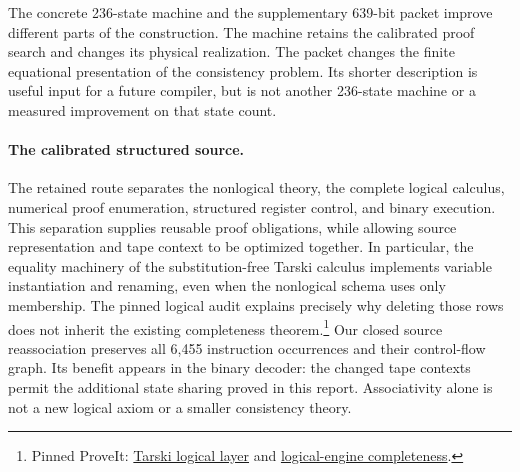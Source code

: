 \label{sec:frontend-comparison}

The concrete 236-state machine and the supplementary 639-bit packet improve
different parts of the construction.  The machine retains the calibrated
proof search and changes its physical realization.  The packet changes the
finite equational presentation of the consistency problem.  Its shorter
description is useful input for a future compiler, but is not another
236-state machine or a measured improvement on that state count.

\paragraph{The calibrated structured source.}
The retained route separates the nonlogical theory, the complete logical
calculus, numerical proof enumeration, structured register control, and
binary execution.  This separation supplies reusable proof obligations,
while allowing source representation and tape context to be optimized
together.  In particular, the equality machinery of the substitution-free
Tarski calculus implements variable instantiation and renaming, even when
the nonlogical schema uses only membership.  The pinned logical audit
explains precisely why deleting those rows does not inherit the existing
completeness theorem.\footnote{Pinned ProveIt:
\href{https://github.com/VladimirReshetnikov/ProveIt/blob/1b27f052d770f4c7d435e82e779bf21f5a1f66ed/Computability/BusyBeaver/Research/ZFC/tarski_logic_layer.md}{Tarski logical layer}
and
\href{https://github.com/VladimirReshetnikov/ProveIt/blob/1b27f052d770f4c7d435e82e779bf21f5a1f66ed/Computability/BusyBeaver/Research/ZFC/logical_engine_completeness.md}{logical-engine completeness}.}
Our closed source reassociation preserves all 6,455 instruction occurrences
and their control-flow graph.  Its benefit appears in the binary decoder:
the changed tape contexts permit the additional state sharing proved in
this report.  Associativity alone is not a new logical axiom or a smaller
consistency theory.

